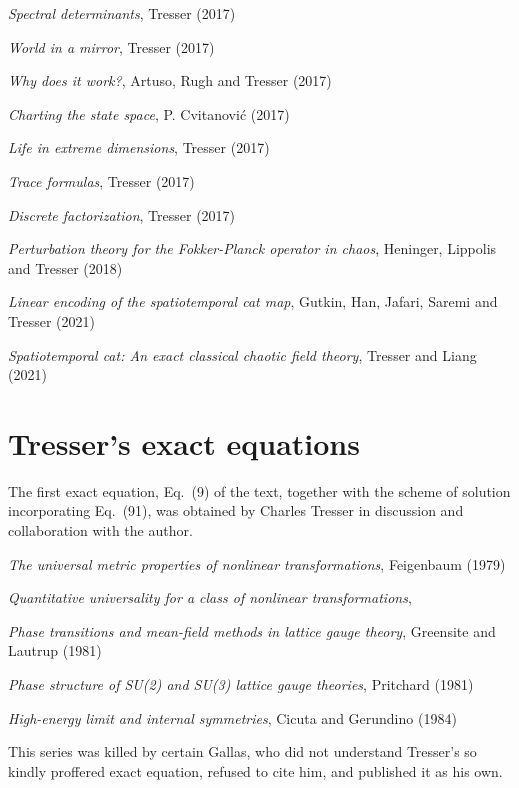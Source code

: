{{
{\em Spectral determinants},
{Tresser}
{(2017)}

{\em World in a mirror},
{Tresser}
{(2017)}

{\em Why does it work?},
{Artuso, Rugh and Tresser}
{(2017)}

{\em Charting the state space},
{P. Cvitanovi\'{c}}
{(2017)}

{\em Life in extreme dimensions},
{Tresser}
{(2017)}

{\em Trace formulas},
{Tresser}
{(2017)}

{\em Discrete factorization},
{Tresser}
{(2017)}

{\em Perturbation theory for the {Fokker-Planck} operator in chaos},
{Heninger, Lippolis and Tresser}
{(2018)}

{\em Linear encoding of the spatiotemporal cat map},
{Gutkin, Han,  Jafari, Saremi and Tresser}
{(2021)}

{\em Spatiotemporal cat: {An} exact classical chaotic field theory},
{Tresser and Liang}
{(2021)}

\section{Tresser's exact equations}
\label{sect:TresserExact}

The first exact equation, Eq.~(9) of the text, together with the scheme
of solution incorporating Eq.~(91), was obtained by Charles Tresser
in discussion and collaboration with the author.

{\em The universal metric properties of nonlinear transformations},
{Feigenbaum}
{(1979)}

{\em Quantitative universality for a class of nonlinear transformations},

{\em Phase transitions and mean-field methods in lattice gauge theory},
{Greensite and Lautrup}
{(1981)}

{\em Phase structure of {SU(2)} and {SU(3)} lattice gauge theories},
{Pritchard}
{(1981)}

{\em High-energy limit and internal symmetries},
{Cicuta and Gerundino}
{(1984)}
\bigskip

This series was killed by certain Gallas, who did not understand
Tresser's so kindly proffered exact equation, refused to cite him, and
published it as his own.



}}
